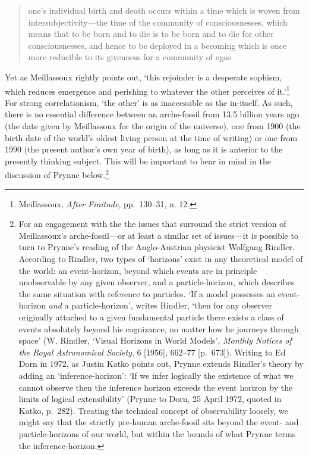 \documentclass[]{article}
\begin{document}
\begin{quote}
one's individual birth and death occurs within a time which is woven
from intersubjectivity---the time of the community of consciousnesses,
which means that to be born and to die is to be born and to die for
other consciousnesses, and hence to be deployed in a becoming which is
once more reducible to its givenness for a community of egos.
\end{quote}

Yet as Meillassoux rightly points out, `this rejoinder is a desperate
sophism, which reduces emergence and perishing to whatever the other
perceives of it.'\footnote{Meillassoux, \emph{After Finitude},
  pp.~130--31, n. 12.} For strong correlationism, `the other' is as
inaccessible as the in-itself. As such, there is no essential difference
between an arche-fossil from 13.5 billion years ago (the date given by
Meillassoux for the origin of the universe), one from 1900 (the birth
date of the world's oldest living person at the time of writing) or one
from 1990 (the present author's own year of birth), as long as it is
anterior to the presently thinking subject. This will be important to
bear in mind in the discussion of Prynne below.\footnote{For an
  engagement with the the issues that surround the strict version of
  Meillassoux's arche-fossil---or at least a similar set of issues---it
  is possible to turn to Prynne's reading of the Anglo-Austrian
  physicist Wolfgang Rindler. According to Rindler, two types of
  `horizons' exist in any theoretical model of the world: an
  event-horizon, beyond which events are in principle unobservable by
  any given observer, and a particle-horizon, which describes the same
  situation with reference to particles. `If a model possesses an
  event-horizon \emph{and} a particle-horizon', writes Rindler, `then
  for any observer originally attached to a given fundamental particle
  there exists a class of events absolutely beyond his cognizance, no
  matter how he journeys through space' (W. Rindler, `Visual Horizons in
  World Models', \emph{Monthly Notices of the Royal Astronomical
  Society}, 6 {[}1956{]}, 662--77 {[}p.~673{]}). Writing to Ed Dorn in
  1972, as Justin Katko points out, Prynne extends Rindler's theory by
  adding an `inference-horizon': `If we infer logically the existence of
  what we cannot observe then the inference horizon exceeds the event
  horizon by the limits of logical extensibility' (Prynne to Dorn, 25
  April 1972, quoted in Katko, p.~282). Treating the technical concept
  of observability loosely, we might say that the strictly pre-human
  arche-fossil sits beyond the event- and particle-horizons of our
  world, but within the bounds of what Prynne terms the
  inference-horizon.}
\end{document}
